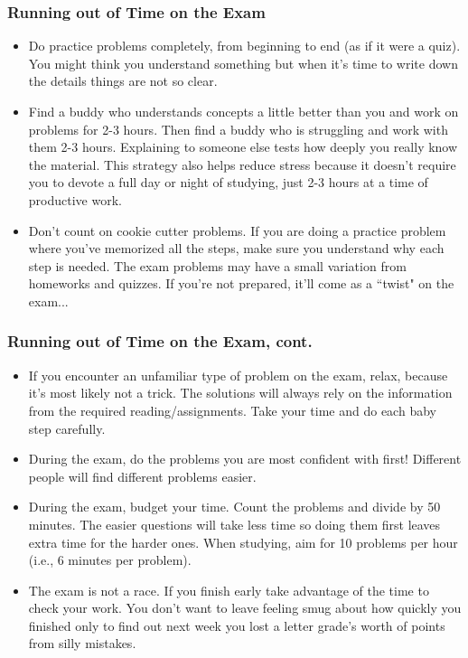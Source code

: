 \documentclass[14pt]{beamer}
\begin{document}
\begin{frame}
\frametitle{Running out of Time on the Exam}
\footnotesize
\begin{itemize}
\item Do practice problems completely, from beginning to end (as if it were a quiz).  You might think you understand something but when it's time to write down the details things are not so clear.  
\item Find a buddy who understands concepts a little better than you and work on problems for 2-3 hours.  Then find a buddy who is struggling and work with them 2-3 hours.  Explaining to someone else tests how deeply you really know the material.  This strategy also helps reduce stress because it doesn't require you to devote a full day or night of studying, just 2-3 hours at a time of productive work.
\item Don't count on cookie cutter problems.  If you are doing a practice problem where you've memorized all the steps, make sure you understand why each step is needed.  The exam problems may have a small variation from homeworks and quizzes.  If you're not prepared, it'll come as a ``twist" on the exam...
\end{itemize}
\end{frame}

\begin{frame}
\frametitle{Running out of Time on the Exam, cont.}
\footnotesize
\begin{itemize}
\item If you encounter an unfamiliar type of problem on the exam, relax, because it's most likely not a trick.  The solutions will always rely on the information from the required reading/assignments.  Take your time and do each baby step carefully.  
\item During the exam, do the problems you are most confident with first!  Different people will find different problems easier.
\item During the exam, budget your time.  Count the problems and divide by 50 minutes.  The easier questions will take less time so doing them first leaves extra time for the harder ones.  When studying, aim for 10 problems per hour (i.e., 6 minutes per problem).
\item The exam is not a race.  If you finish early take advantage of the time to check your work.  You don't want to leave feeling smug about how quickly you finished only to find out next week you lost a letter grade's worth of points from silly mistakes.
\end{itemize}
\end{frame}
\end{document}
